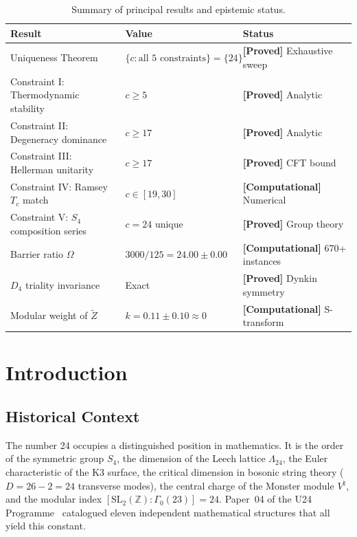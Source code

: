 \documentclass[12pt,a4paper]{article}
\newcommand{\proved}[1]{\textcolor{proved}{\textbf{[Proved]}} #1}
\newcommand{\computational}[1]{\textcolor{computational}{\textbf{[Computational]}} #1}
\theoremstyle{definition}
\theoremstyle{remark}
\newcommand{\Sfour}{S_4}
\newcommand{\Leech}{\Lambda_{24}}
\begin{document}
\begin{table}[H]
\centering
\caption{Summary of principal results and epistemic status.}
\label{tab:summary}
\begin{tabular}{@{}lll@{}}
\toprule
\textbf{Result} & \textbf{Value} & \textbf{Status} \\
\midrule
Uniqueness Theorem & $\{c : \text{all 5 constraints}\} = \{24\}$ & \proved{Exhaustive sweep} \\
Constraint I: Thermodynamic stability & $c \ge 5$ & \proved{Analytic} \\
Constraint II: Degeneracy dominance & $c \ge 17$ & \proved{Analytic} \\
Constraint III: Hellerman unitarity & $c \ge 17$ & \proved{CFT bound} \\
Constraint IV: Ramsey $T_c$ match & $c \in [19, 30]$ & \computational{Numerical} \\
Constraint V: $\Sfour$ composition series & $c = 24$ unique & \proved{Group theory} \\
Barrier ratio $\Omega$ & $3000/125 = 24.00 \pm 0.00$ & \computational{670+ instances} \\
$D_4$ triality invariance & Exact & \proved{Dynkin symmetry} \\
Modular weight of $\tilde{Z}$ & $k = 0.11 \pm 0.10 \approx 0$ & \computational{S-transform} \\
\bottomrule
\end{tabular}
\end{table}

\section{Introduction}
\label{sec:intro}

\subsection{Historical Context}

The number 24 occupies a distinguished position in mathematics.  It is the order of the symmetric group $\Sfour$, the dimension of the Leech lattice $\Leech$, the Euler characteristic of the K3 surface, the critical dimension in bosonic string theory ($D = 26 - 2 = 24$ transverse modes), the central charge of the Monster module $V^\natural$, and the modular index $[\text{SL}_2(\mathbb{Z}) : \Gamma_0(23)] = 24$.  Paper~04 of the U24 Programme~\cite{DWR2026omega24} catalogued eleven independent mathematical structures that all yield this constant.
\end{document}
